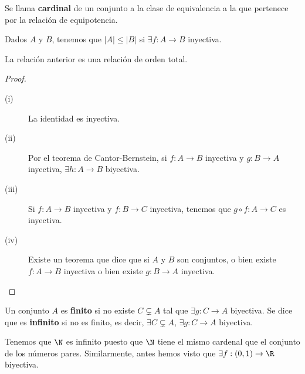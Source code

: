 \begin{fdefinition}[Cardinal]
\normalfont Se llama \textbf{cardinal} de un conjunto a la clase de equivalencia a la que pertenece por la relación de equipotencia.
\end{fdefinition}
\begin{fdefinition}[]
\normalfont Dados $\displaystyle A $ y $\displaystyle B $, tenemos que $\displaystyle \left|A\right| \leq \left|B\right| $ si $\displaystyle \exists f : A \to B $ inyectiva. 
\end{fdefinition}

\begin{fprop}[]
\normalfont La relación anterior es una relación de orden total.
\end{fprop}
\begin{proof}
\begin{description}
\item[(i)] La identidad es inyectiva.
\item[(ii)] Por el teorema de Cantor-Bernstein, si $\displaystyle f: A \to B $ inyectiva y $\displaystyle g : B \to A $ inyectiva, $\displaystyle \exists h : A \to B $ biyectiva.
\item[(iii)] Si $\displaystyle f : A \to B $ inyectiva y $\displaystyle f: B \to C $ inyectiva, tenemos que $\displaystyle g \circ f : A \to C $ es inyectiva.
\item[(iv)] Existe un teorema que dice que si $\displaystyle A $ y $\displaystyle B $ son conjuntos, o bien existe $\displaystyle f: A \to B $ inyectiva o bien existe $\displaystyle g : B \to A $ inyectiva.
\end{description}
\end{proof}

\begin{fdefinition}[]
\normalfont Un conjunto $\displaystyle A $ es \textbf{finito} si no existe $\displaystyle C \subsetneq A $ tal que $\displaystyle \exists g : C \to A $ biyectiva. Se dice que es \textbf{infinito} si no es finito, es decir, $\displaystyle \exists C \subsetneq A $, $\displaystyle \exists g : C \to A $ biyectiva.
\end{fdefinition}

\begin{eg}
\normalfont Tenemos que $\displaystyle \N $ es infinito puesto que $\displaystyle \N $ tiene el mismo cardenal que el conjunto de los números pares. Similarmente, antes hemos visto que $\displaystyle \exists f : \left(0,1\right) \to \R $ biyectiva.
\end{eg}

